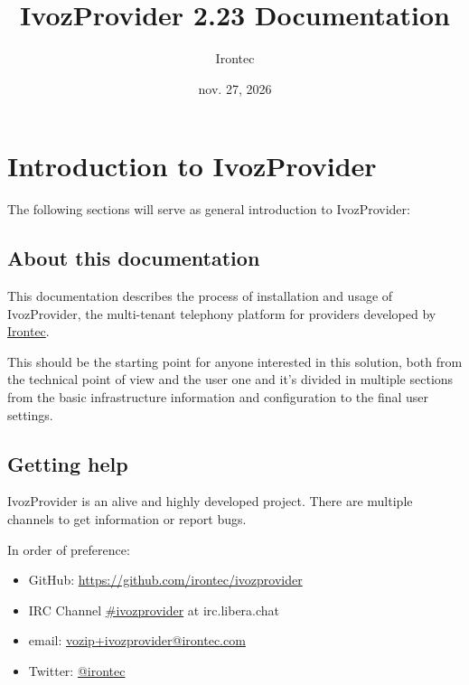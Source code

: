 \documentclass[letterpaper,10pt,spanish]{sphinxmanual}
\title{IvozProvider 2.23 Documentation}
\date{nov. 27, 2026}
\author{Irontec}
\begin{document}
\maketitle
\tableofcontents
{}\label{index::doc}



\chapter{Introduction to IvozProvider}
\label{basic_concepts/intro/index::doc}\label{basic_concepts/intro/index:introduction-to-ivozprovider}\label{basic_concepts/intro/index:ivozprovider-official-documentation}
The following sections will serve as general introduction to IvozProvider:


\section{About this documentation}
\label{basic_concepts/intro/about::doc}\label{basic_concepts/intro/about:about-this-documentation}
This documentation describes the process of installation and usage of
IvozProvider, the multi-tenant telephony platform for providers developed
by \href{http://irontec.com}{Irontec}.

This should be the starting point for anyone interested in this solution,
both from the technical point of view and the user one and it's divided
in multiple sections from the basic infrastructure information and configuration
to the final user settings.


\section{Getting help}
\label{basic_concepts/intro/getting_help:getting-help}\label{basic_concepts/intro/getting_help::doc}\label{basic_concepts/intro/getting_help:id1}
IvozProvider is an alive and highly developed project. There are
multiple channels to get information or report bugs.

In order of preference:
\begin{itemize}
\item {} 
GitHub: \url{https://github.com/irontec/ivozprovider}

\item {} 
IRC Channel \href{https://kiwiirc.com/nextclient/irc.libera.chat/\#ivozprovider}{\#ivozprovider} at irc.libera.chat

\item {} 
email: \href{mailto:vozip+ivozprovider@irontec.com}{vozip+ivozprovider@irontec.com}

\item {} 
Twitter: \href{https://twitter.com/irontec}{@irontec}

\end{itemize}
\end{document}
